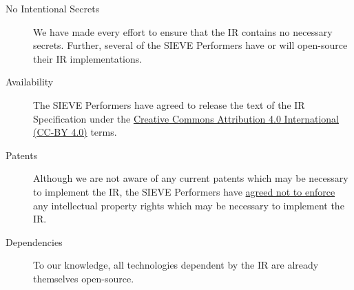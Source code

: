 \begin{description}
  \item[No Intentional Secrets] We have made every effort to ensure that the IR contains no necessary secrets. Further, several of the SIEVE Performers have or will open-source their IR implementations.
  \item[Availability] The SIEVE Performers have agreed to release the text of the IR Specification under the \href{https://creativecommons.org/licenses/by/4.0/}{Creative Commons Attribution 4.0 International (CC-BY 4.0)} terms.
  \item[Patents] Although we are not aware of any current patents which may be necessary to implement the IR, the SIEVE Performers have \href{https://github.com/sieve-zk/ir/raw/main/v1.0.1/release\_acknowledgments.pdf}{agreed not to enforce} any intellectual property rights which may be necessary to implement the IR.
  \item[Dependencies] To our knowledge, all technologies dependent by the IR are already themselves open-source.
\end{description}
